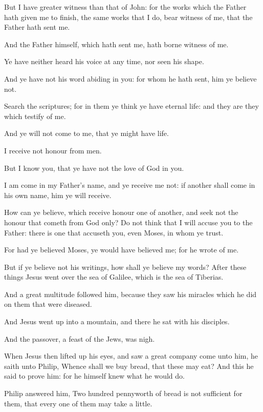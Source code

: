 \Verse But I have greater witness than that of John: for the works which the Father hath given me to finish, the same works that I do, bear witness of me, that the Father hath sent me.

\Verse And the Father himself, which hath sent me, hath borne witness of me.

Ye have neither heard his voice at any time, nor seen his shape.

\Verse And ye have not his word abiding in you: for whom he hath sent, him ye believe not.

\Verse Search the scriptures; for in them ye think ye have eternal life: and they are they which testify of me.

\Verse And ye will not come to me, that ye might have life.

\Verse I receive not honour from men.

\Verse But I know you, that ye have not the love of God in you.

\Verse I am come in my Father's name, and ye receive me not: if another shall come in his own name, him ye will receive.

\Verse How can ye believe, which receive honour one of another, and seek not the honour that cometh from God only?  \Verse Do not think that I will accuse you to the Father: there is one that accuseth you, even Moses, in whom ye trust.

\Verse For had ye believed Moses, ye would have believed me; for he wrote of me.

\Verse But if ye believe not his writings, how shall ye believe my words?  
\Chapter
\Verse After these things Jesus went over the sea of Galilee, which is the sea of Tiberias.

\Verse And a great multitude followed him, because they saw his miracles which he did on them that were diseased.

\Verse And Jesus went up into a mountain, and there he sat with his disciples.

\Verse And the passover, a feast of the Jews, was nigh.

\Verse When Jesus then lifted up his eyes, and saw a great company come unto him, he saith unto Philip, Whence shall we buy bread, that these may eat?  \Verse And this he said to prove him: for he himself knew what he would do.

\Verse Philip answered him, Two hundred pennyworth of bread is not sufficient for them, that every one of them may take a little.

